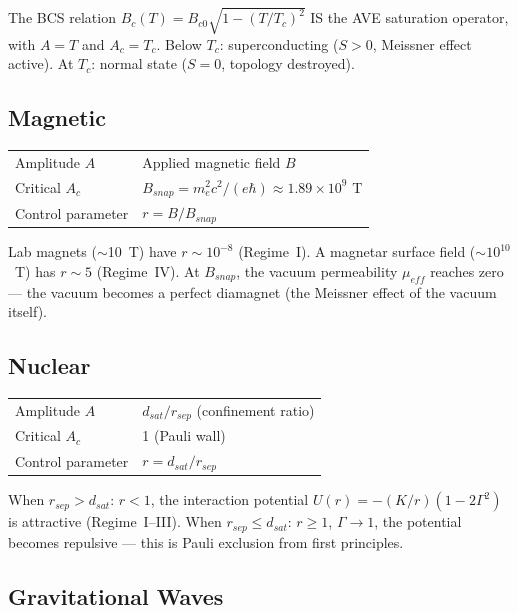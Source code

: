 \noindent The BCS relation $B_c(T) = B_{c0}\sqrt{1 - (T/T_c)^2}$ IS the AVE saturation operator, with $A = T$ and $A_c = T_c$. Below $T_c$: superconducting ($S > 0$, Meissner effect active). At $T_c$: normal state ($S = 0$, topology destroyed).

\subsection{Magnetic}

\begin{center}
\begin{tabular}{ll}
\toprule
Amplitude $A$ & Applied magnetic field $B$ \\
Critical $A_c$ & $B_{snap} = m_e^2 c^2/(e\hbar) \approx 1.89 \times 10^9$ T \\
Control parameter & $r = B / B_{snap}$ \\
\bottomrule
\end{tabular}
\end{center}

\noindent Lab magnets ($\sim$10~T) have $r \sim 10^{-8}$ (Regime~I). A magnetar surface field ($\sim 10^{10}$~T) has $r \sim 5$ (Regime~IV). At $B_{snap}$, the vacuum permeability $\mu_{eff}$ reaches zero --- the vacuum becomes a perfect diamagnet (the Meissner effect of the vacuum itself).

\subsection{Nuclear}

\begin{center}
\begin{tabular}{ll}
\toprule
Amplitude $A$ & $d_{sat}/r_{sep}$ (confinement ratio) \\
Critical $A_c$ & 1 (Pauli wall) \\
Control parameter & $r = d_{sat}/r_{sep}$ \\
\bottomrule
\end{tabular}
\end{center}

\noindent When $r_{sep} > d_{sat}$: $r < 1$, the interaction potential $U(r) = -(K/r)(1 - 2\Gamma^2)$ is attractive (Regime~I--III). When $r_{sep} \leq d_{sat}$: $r \geq 1$, $\Gamma \to 1$, the potential becomes repulsive --- this is Pauli exclusion from first principles.

\subsection{Gravitational Waves}

